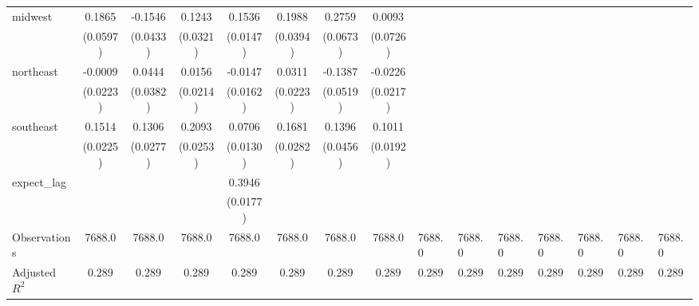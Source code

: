 \begin{tabular}{lccccccc}
midwest & 0.1865 & -0.1546 & 0.1243 & 0.1536 & 0.1988 & 0.2759 & 0.0093 \\
\vspace{0.2cm}
 & (0.0597) & (0.0433) & (0.0321) & (0.0147) & (0.0394) & (0.0673) & (0.0726) \\
northeast & -0.0009 & 0.0444 & 0.0156 & -0.0147 & 0.0311 & -0.1387 & -0.0226 \\
\vspace{0.2cm}
 & (0.0223) & (0.0382) & (0.0214) & (0.0162) & (0.0223) & (0.0519) & (0.0217) \\
southeast & 0.1514 & 0.1306 & 0.2093 & 0.0706 & 0.1681 & 0.1396 & 0.1011 \\
\vspace{0.2cm}
 & (0.0225) & (0.0277) & (0.0253) & (0.0130) & (0.0282) & (0.0456) & (0.0192) \\
expect_lag &  &  &  & 0.3946 &  &  &  \\
\vspace{0.2cm}
 &  &  &  & (0.0177) &  &  &  \\
\midrule
Observations & 7688.0 & 7688.0 & 7688.0 & 7688.0 & 7688.0 & 7688.0 & 7688.0 & 7688.0 & 7688.0 & 7688.0 & 7688.0 & 7688.0 & 7688.0 & 7688.0 \\
Adjusted $R^2$ & 0.289 & 0.289 & 0.289 & 0.289 & 0.289 & 0.289 & 0.289 & 0.289 & 0.289 & 0.289 & 0.289 & 0.289 & 0.289 & 0.289 \\
\bottomrule
\end{tabular}